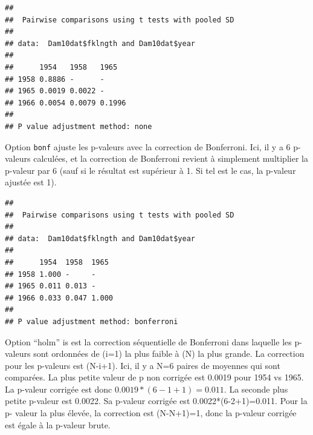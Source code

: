 \documentclass[12pt,]{book}
\newenvironment{Shaded}{\begin{snugshade}}{\end{snugshade}}
\newcommand{\DataTypeTok}[1]{\textcolor[rgb]{0.27,0.27,0.27}{#1}}
\newcommand{\KeywordTok}[1]{\textcolor[rgb]{0.27,0.27,0.27}{\textbf{#1}}}
\newcommand{\NormalTok}[1]{#1}
\newcommand{\OperatorTok}[1]{\textcolor[rgb]{0.43,0.43,0.43}{\textbf{#1}}}
\newcommand{\StringTok}[1]{\textcolor[rgb]{0.5,0.5,0.5}{#1}}
\begin{document}
\begin{verbatim}
## 
## 	Pairwise comparisons using t tests with pooled SD 
## 
## data:  Dam10dat$fklngth and Dam10dat$year 
## 
##      1954   1958   1965  
## 1958 0.8886 -      -     
## 1965 0.0019 0.0022 -     
## 1966 0.0054 0.0079 0.1996
## 
## P value adjustment method: none
\end{verbatim}

Option \texttt{bonf} ajuste les p-valeurs avec la correction de Bonferroni. Ici, il y a 6 p-valeurs calculées, et la correction de Bonferroni revient à simplement multiplier la p-valeur par 6 (sauf si le résultat est supérieur à 1. Si tel est le cas, la p-valeur ajustée est 1).

\begin{Shaded}
\end{Shaded}

\begin{verbatim}
## 
## 	Pairwise comparisons using t tests with pooled SD 
## 
## data:  Dam10dat$fklngth and Dam10dat$year 
## 
##      1954  1958  1965 
## 1958 1.000 -     -    
## 1965 0.011 0.013 -    
## 1966 0.033 0.047 1.000
## 
## P value adjustment method: bonferroni
\end{verbatim}

Option ``holm'' is est la correction séquentielle de Bonferroni dans laquelle les p-valeurs sont ordonnées de (i=1) la plus faible à (N) la plus grande. La correction pour les p-valeurs est (N-i+1). Ici, il y a N=6 paires de moyennes qui sont comparées. La plus petite valeur de p non corrigée est 0.0019 pour 1954 vs 1965. La p-valeur corrigée est donc \(0.0019*(6-1+1)=0.011\). La seconde plus petite p-valeur est 0.0022. Sa p-valeur corrigée est 0.0022*(6-2+1)=0.011. Pour la p- valeur la plus élevée, la correction est (N-N+1)=1, donc la p-valeur corrigée est égale à la p-valeur brute.

\begin{Shaded}
\end{Shaded}
\end{document}
